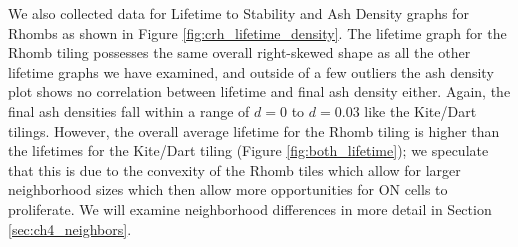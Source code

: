 \documentclass[a4paper,11pt,twoside]{report}
\begin{document}
We also collected data for Lifetime to Stability and Ash Density graphs for Rhombs as shown in Figure \ref{fig:crh_lifetime_density}. The lifetime graph for the Rhomb tiling possesses the same overall right-skewed shape as all the other lifetime graphs we have examined, and outside of a few outliers the ash density plot shows no correlation between lifetime and final ash density either. Again, the final ash densities fall within a range of $d=0$ to $d=0.03$ like the Kite/Dart tilings. However, the overall average lifetime for the Rhomb tiling is higher than the lifetimes for the Kite/Dart tiling (Figure \ref{fig:both_lifetime}); we speculate that this is due to the convexity of the Rhomb tiles which allow for larger neighborhood sizes which then allow more opportunities for ON cells to proliferate. We will examine neighborhood differences in more detail in Section \ref{sec:ch4_neighbors}.
\end{document}
